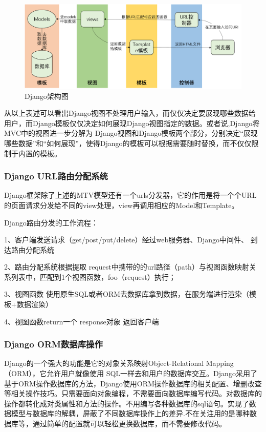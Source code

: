 \documentclass[a4paper]{ltxdoc}
\begin{document}
{		\begin{figure}[!htb]
			\centering
			\includegraphics[width=1.0\linewidth]{images/5.png}
			\caption{Django架构图}
		\end{figure}
		
		从以上表述可以看出Django视图不处理用户输入，而仅仅决定要展现哪些数据给用户，而Django模板仅仅决定如何展现Django视图指定的数据。或者说,Django将MVC中的视图进一步分解为 Django视图和Django模板两个部分，分别决定“展现哪些数据”和“如何展现”，使得Django的模板可以根据需要随时替换，而不仅仅限制于内置的模板。
		
		\subsubsection{Django URL路由分配系统}
		
		Django框架除了上述的MTV模型还有一个urls分发器，它的作用是将一个个URL的页面请求分发给不同的view处理，view再调用相应的Model和Template。
		
		Django路由分发的工作流程：
		
		1、客户端发送请求（get/post/put/delete）经过web服务器、Django中间件、 到达路由分配系统 
		
		2、路由分配系统根据提取 request中携带的的url路径（path）与视图函数映射关系列表中，匹配到1个视图函数，foo（request）执行；
		
		3、视图函数 使用原生SQL或者ORM去数据库拿到数据，在服务端进行渲染（模板+数据渲染）
		
		4、视图函数return一个 response对象 返回客户端
		
		\subsubsection{Django ORM数据库操作}
		Django的一个强大的功能是它的对象关系映射Object-Relational Mapping（ORM），它允许用户就像使用 SQL一样去和用户的数据库交互。Django采用了基于ORM操作数据库的方法，Django使用ORM操作数据库的相关配置、增删改查等相关操作技巧。只需要面向对象编程，不需要面向数据库编写代码。对数据库的操作都转化成对类属性和方法的操作。不用编写各种数据库的sql语句。实现了数据模型与数据库的解耦，屏蔽了不同数据库操作上的差异.不在关注用的是哪种数据库等，通过简单的配置就可以轻松更换数据库，而不需要修改代码。
		
}
\end{document}
